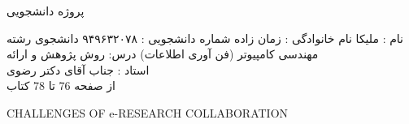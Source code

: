 \documentclass[a4paper,12pt]{article}
\begin{document}
\begin{center}                                                                                                                                                                                       پروژه دانشجویی 

\end{center}


\noindent
   نام : ملیکا
 نام خانوادگی : زمان زاده  
 شماره دانشجویی : ۹۴۹۶۳۲۰۷۸ 
 دانشجوی رشته مهندسی کامپیوتر (فن آوری اطلاعات)
 درس:  روش پژوهش و   ارائه \\
 استاد  : جناب  آقای دکتر رضوی\\        از صفحه 76 تا 78 کتاب 
   \noindent

\vspace{0.1cm}
\vspace{0.1cm}
\vspace{0.1cm}
\begin{center}

CHALLENGES OF e-RESEARCH COLLABORATION

\end{center}
      
\end{document}
